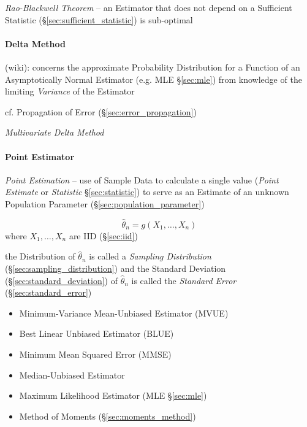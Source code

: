 \emph{Rao-Blackwell Theorem} -- an Estimator that does not depend on a
Sufficient Statistic (\S\ref{sec:sufficient_statistic}) is sub-optimal



\paragraph{Delta Method}\label{sec:delta_method}\hfill

(wiki): concerns the approximate Probability Distribution for a Function of an
Asymptotically Normal Estimator (e.g. MLE \S\ref{sec:mle}) from knowledge of the
limiting \emph{Variance} of the Estimator

\fist cf. Propagation of Error (\S\ref{sec:error_propagation})

\emph{Multivariate Delta Method}



\paragraph{Point Estimator}\label{sec:point_estimator}\hfill

\emph{Point Estimation} -- use of Sample Data to calculate a single value
(\emph{Point Estimate} or \emph{Statistic} \S\ref{sec:statistic}) to serve as an
Estimate of an unknown Population Parameter (\S\ref{sec:population_parameter})

\[
  \hat{\theta}_n = g(X_1, \ldots, X_n)
\]
where $X_1, \ldots, X_n$ are IID (\S\ref{sec:iid})

the Distribution of $\hat{\theta}_n$ is called a \emph{Sampling Distribution}
(\S\ref{sec:sampling_distribution}) and the Standard Deviation
(\S\ref{sec:standard_deviation}) of $\hat{\theta}_n$ is called the
\emph{Standard Error} (\S\ref{sec:standard_error})

\begin{itemize}
  \item Minimum-Variance Mean-Unbiased Estimator (MVUE)
  \item Best Linear Unbiased Estimator (BLUE)
  \item Minimum Mean Squared Error (MMSE)
  \item Median-Unbiased Estimator
  \item Maximum Likelihood Estimator (MLE \S\ref{sec:mle})
  \item Method of Moments (\S\ref{sec:moments_method})
\end{itemize}

